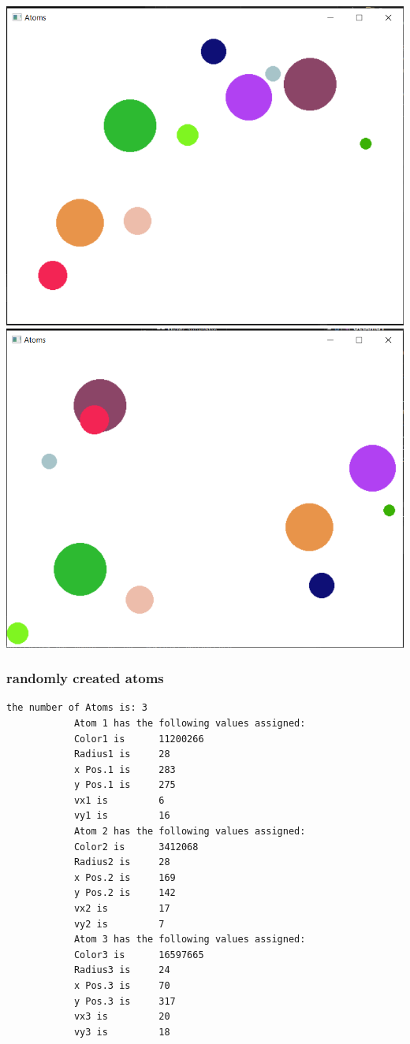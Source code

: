 \documentclass[11pt,titlepage]{article}
\begin{document}
			\includegraphics[scale=0.5]{pictures/input_nocollision.png}
			\includegraphics[scale=0.5]{pictures/input_nocollision_final.png}
			
			\subsubsection{randomly created atoms}
			\begin{lstlisting}[numbers=none]
			the number of Atoms is: 3
			Atom 1 has the following values assigned:
			Color1 is      11200266
			Radius1 is     28
			x Pos.1 is     283
			y Pos.1 is     275
			vx1 is         6
			vy1 is         16
			Atom 2 has the following values assigned:
			Color2 is      3412068
			Radius2 is     28
			x Pos.2 is     169
			y Pos.2 is     142
			vx2 is         17
			vy2 is         7
			Atom 3 has the following values assigned:
			Color3 is      16597665
			Radius3 is     24
			x Pos.3 is     70
			y Pos.3 is     317
			vx3 is         20
			vy3 is         18
			\end{lstlisting}
\end{document}
